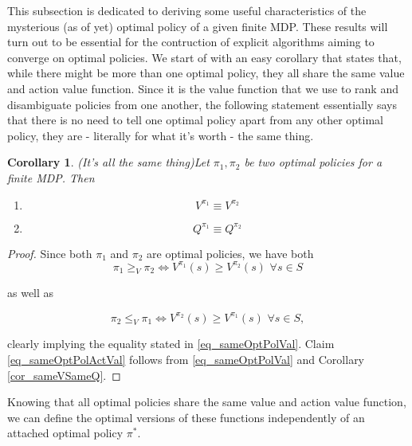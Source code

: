 \documentclass[11pt]{article} %
\newtheorem{cor}{Corollary}
\begin{document}
This subsection is dedicated to deriving some useful characteristics of the mysterious (as of yet) optimal policy of a given finite MDP. These results will turn out to be essential for the contruction of explicit algorithms aiming to converge on optimal policies. We start of with an easy corollary that states that, while there might be more than one optimal policy, they all share the same value and action value function. Since it is the value function that we use to rank and disambiguate policies from one another, the following statement essentially says that there is no need to tell one optimal policy apart from any other optimal policy, they are - literally for what it's worth - the same thing.

\begin{cor}{(It's all the same thing)}\label{cor_sameOptPol}
	Let $\pi_1, \pi_2$ be two optimal policies for a finite MDP. Then
	\begin{enumerate}
		\item \begin{equation}\label{eq_sameOptPolVal} V^{\pi_1} \equiv V^{\pi_2} \end{equation}
		\item \begin{equation}\label{eq_sameOptPolActVal} Q^{\pi_1} \equiv Q^{\pi_2} \end{equation}
	\end{enumerate}
\end{cor}

\begin{proof}
	Since both $\pi_1$ and $\pi_2$ are optimal policies, we have both
	\begin{equation}
		\pi_1 \ge_V \pi_2 \Leftrightarrow V^{\pi_1}(s) \ge V^{\pi_2}(s) \, \, \forall s \in S
	\end{equation}

	as well as

	\begin{equation}
		\pi_2 \le_V \pi_1 \Leftrightarrow V^{\pi_2}(s) \ge V^{\pi_1}(s) \, \, \forall s \in S,
	\end{equation}

	clearly implying the equality stated in \ref{eq_sameOptPolVal}. Claim \ref{eq_sameOptPolActVal} follows from \ref{eq_sameOptPolVal} and Corollary \ref{cor_sameVSameQ}.

\end{proof}

Knowing that all optimal policies share the same value and action value function, we can define the optimal versions of these functions independently of an attached optimal policy $\pi^*$.
\end{document}
